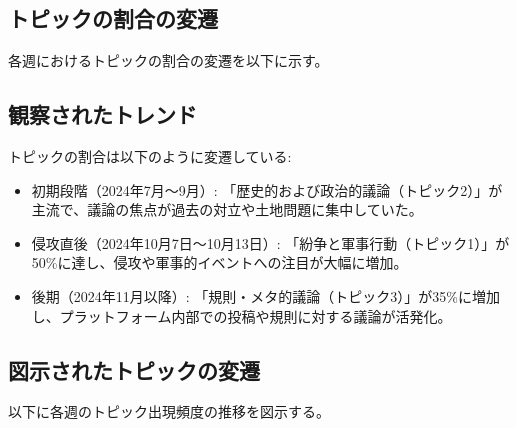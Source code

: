\documentclass[11pt, a4j]{jreport}
\begin{document}
    \subsection*{トピックの割合の変遷}
    各週におけるトピックの割合の変遷を以下に示す。

    \begin{table}[H]
    \centering
    \caption{各週におけるトピックの割合}
    \label{tab:topic_ratios}
    \end{table}

    \subsection*{観察されたトレンド}
    トピックの割合は以下のように変遷している:
    \begin{itemize}
        \item 初期段階（2024年7月～9月）: 「歴史的および政治的議論（トピック2）」が主流で、議論の焦点が過去の対立や土地問題に集中していた。
        \item 侵攻直後（2024年10月7日～10月13日）: 「紛争と軍事行動（トピック1）」が50\%に達し、侵攻や軍事的イベントへの注目が大幅に増加。
        \item 後期（2024年11月以降）: 「規則・メタ的議論（トピック3）」が35\%に増加し、プラットフォーム内部での投稿や規則に対する議論が活発化。
    \end{itemize}

    \subsection*{図示されたトピックの変遷}
    以下に各週のトピック出現頻度の推移を図示する。
\end{document}
